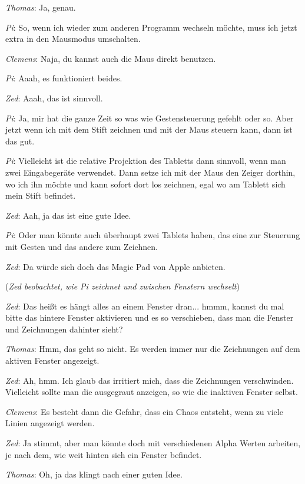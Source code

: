 \medskip \emph{Thomas}: Ja, genau.

\medskip \emph{Pi}: So, wenn ich wieder zum anderen Programm wechseln möchte, muss ich jetzt extra in den Mausmodus umschalten.

\medskip \emph{Clemens}: Naja, du kannst auch die Maus direkt benutzen.

\medskip \emph{Pi}: Aaah, es funktioniert beides.

\medskip \emph{Zed}: Aaah, das ist sinnvoll.

\medskip \emph{Pi}: Ja, mir hat die ganze Zeit so was wie Gestensteuerung gefehlt oder so. Aber jetzt wenn ich mit dem Stift zeichnen und mit der Maus steuern kann, dann ist das gut.

\medskip \emph{Pi}: Vielleicht ist die relative Projektion des Tabletts dann sinnvoll, wenn man zwei Eingabegeräte verwendet. Dann setze ich mit der Maus den Zeiger dorthin, wo ich ihn möchte und kann sofort dort los zeichnen, egal wo am Tablett sich mein Stift befindet.

\medskip \emph{Zed}: Aah, ja das ist eine gute Idee.

\medskip \emph{Pi}: Oder man könnte auch überhaupt zwei Tablets haben, das eine zur Steuerung mit Gesten und das andere zum Zeichnen.

\medskip \emph{Zed}: Da würde sich doch das Magic Pad von Apple anbieten.

\medskip (\emph{Zed beobachtet, wie Pi zeichnet und zwischen Fenstern wechselt})

\medskip \emph{Zed}: Das heißt es hängt alles an einem Fenster dran... hmmm, kannst du mal bitte das hintere Fenster aktivieren und es so verschieben, dass man die Fenster und Zeichnungen dahinter sieht?

\medskip \emph{Thomas}: Hmm, das geht so nicht. Es werden immer nur die Zeichnungen auf dem aktiven Fenster angezeigt.

\medskip \emph{Zed}: Ah, hmm. Ich glaub das irritiert mich, dass die Zeichnungen verschwinden. Vielleicht sollte man die ausgegraut anzeigen, so wie die inaktiven Fenster selbst.

\medskip \emph{Clemens}: Es besteht dann die Gefahr, dass ein Chaos entsteht, wenn zu viele Linien angezeigt werden.

\medskip \emph{Zed}: Ja stimmt, aber man könnte doch mit verschiedenen Alpha Werten arbeiten, je nach dem, wie weit hinten sich ein Fenster befindet.

\medskip \emph{Thomas}: Oh, ja das klingt nach einer guten Idee.

